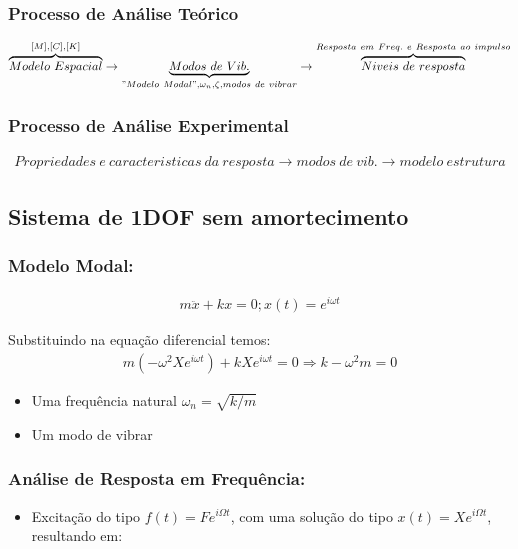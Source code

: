 \documentclass{article}
\begin{document}
\subsubsection*{Processo de Análise Teórico}
\begin{align*}
    \overbrace{Modelo\ Espacial }^{[M], [C], [K]}\rightarrow \underbrace{Modos\ de\ Vib.}_{"Modelo\ Modal", \omega_n, \zeta, modos\ de \ vibrar} \rightarrow \overbrace{Niveis\ de\ resposta}^{Resposta\ em\ Freq.\ e\ Resposta\ ao\ impulso}
\end{align*}

\subsubsection*{Processo de Análise Experimental}
\begin{align*}
    Propriedades\ e\ caracteristicas\ da\ resposta \rightarrow modos\ de\ vib. \rightarrow modelo\ estrutura
\end{align*}


\subsection{Sistema de 1DOF sem amortecimento}
\subsubsection*{Modelo Modal:}
\begin{align*}
    m \ddot x + kx = 0; x(t) = e^{i\omega t}
\end{align*}

Substituindo na equação diferencial temos:
\begin{align*}
    m(-\omega^2 X e^{i \omega t}) + k X e^{i \omega t} = 0 \Rightarrow k-\omega^2 m= 0
\end{align*}

\begin{itemize}
    \item Uma frequência natural $\omega_n = \sqrt{k/m}$
    \item Um modo de vibrar
\end{itemize}

\subsubsection*{Análise de Resposta em Frequência:}
\begin{itemize}
    \item Excitação do tipo $f(t) = Fe^{i\Omega t}$, com uma solução do tipo $x(t) = Xe^{i\Omega t}$,  resultando em:
\end{itemize}
\end{document}

